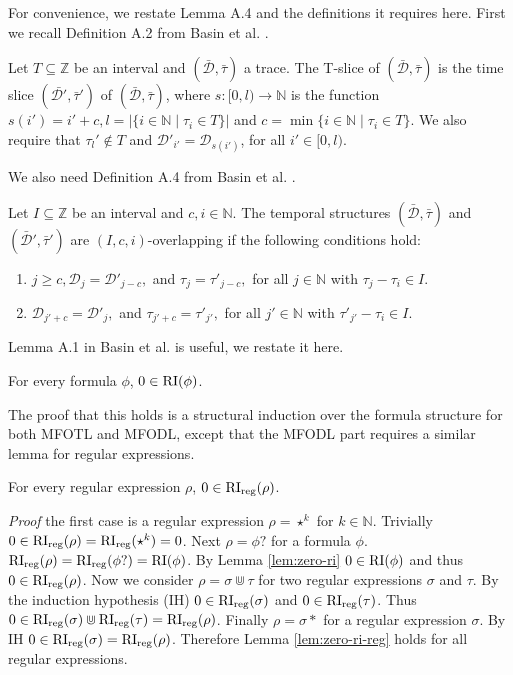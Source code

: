 For convenience, we restate Lemma A.4 and the definitions it requires here.
First we recall Definition A.2 from Basin et al. \cite{Basin2016}.
\begin{definition}
    \label{def:t-slice}
    Let $T \subseteq \mathbb{Z}$ be an interval and $(\bar{\mathcal{D}}, \bar{\tau})$ a trace.
    The T-slice of $(\bar{\mathcal{D}}, \bar{\tau})$ is the time slice $(\bar{\mathcal{D}'}, \bar{\tau}')$ of $(\bar{\mathcal{D}}, \bar{\tau})$, 
        where $s: [0,l) \to \mathbb{N}$ is the function $s(i') = i' + c, l = |\{i \in \mathbb{N} \mid \tau_i \in T \}|$ and $c = \min\{i \in \mathbb{N} \mid \tau_i \in T \}$.
    We also require that $\tau_l' \not\in T$ and $\mathcal{D}'_{i'} = \mathcal{D}_{s(i')}$, for all $i' \in [0,l)$.
\end{definition}
We also need Definition A.4 from Basin et al. \cite{Basin2016}.
\begin{definition}
    \label{def:overlapping}
    Let $I \subseteq \mathbb{Z}$ be an interval and $c,i \in \mathbb{N}$.
    The temporal structures $(\bar{\mathcal{D}}, \bar{\tau})$ and $(\bar{\mathcal{D}}', \bar{\tau}')$ are $(I,c,i)$-overlapping if the following conditions hold:
    \renewcommand{\labelenumi}{\arabic{enumi}.}
    \begin{enumerate}
        \item $j \geq c, \mathcal{D}_j = \mathcal{D}'_{j-c},$ and $\tau_j = \tau'_{j-c},$ for all $j \in \mathbb{N}$ with $\tau_j - \tau_i \in I$.
        \item $\mathcal{D}_{j'+c} = \mathcal{D}'_j,$ and $\tau_{j'+c} = \tau'_{j'},$ for all $j' \in \mathbb{N}$ with $\tau'_{j'}-\tau_i \in I$.
    \end{enumerate}
\end{definition}

Lemma A.1 in Basin et al. \cite{Basin2016} is useful, we restate it here.
\begin{lemma}
    \label{lem:zero-ri}
    For every formula $\phi$, $0 \in \operatorname{RI}(\phi)$.
\end{lemma}
The proof that this holds is a structural induction over the formula structure for both MFOTL and MFODL, except that the MFODL part requires a similar lemma for regular expressions.

\begin{lemma}
    \label{lem:zero-ri-reg}
    For every regular expression $\rho$, $0 \in \operatorname{RI}_{\text{reg}}(\rho)$.
\end{lemma}
\textit{Proof} the first case is a regular expression $\rho = \star^k$ for $k \in \mathbb{N}$.
Trivially $0 \in \operatorname{RI}_{\text{reg}}(\rho) = \operatorname{RI}_{\text{reg}}(\star^k) = {0}$.
Next $\rho = \phi?$ for a formula $\phi$.
$\operatorname{RI}_{\text{reg}}(\rho) = \operatorname{RI}_{\text{reg}}(\phi?) = \operatorname{RI}(\phi)$.
By Lemma \ref{lem:zero-ri} $0 \in \operatorname{RI}(\phi)$ and thus $0 \in \operatorname{RI}_{\text{reg}}(\rho)$.
Now we consider $\rho = \sigma \Cup \tau$ for two regular expressions $\sigma$ and $\tau$.
By the induction hypothesis (IH) $0 \in \operatorname{RI}_{\text{reg}}(\sigma)$ and $0 \in \operatorname{RI}_{\text{reg}}(\tau)$.
Thus $0 \in \operatorname{RI}_{\text{reg}}(\sigma) \Cup \operatorname{RI}_{\text{reg}}(\tau) = \operatorname{RI}_{\text{reg}}(\rho)$.
Finally $\rho = \sigma *$ for a regular expression $\sigma$.
By IH $0 \in \operatorname{RI}_{\text{reg}}(\sigma) = \operatorname{RI}_{\text{reg}}(\rho)$.
Therefore Lemma \ref{lem:zero-ri-reg} holds for all regular expressions.

